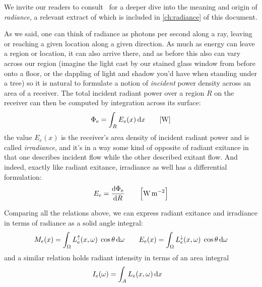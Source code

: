 We invite our readers to consult~\cite{nicodemus63} for a deeper dive into
the meaning and origin of \textsl{\gls{radiance}}, a relevant
extract of which is included in \cref{ch:radiance} of this document.

As we said, one can think of radiance as photons per second along 
a ray, leaving or reaching a given location along a given direction.
As much as energy can leave a region or location, it can also
arrive there, and as before this also can vary across our region 
(imagine the light cast by our stained glass window from before onto a floor,
or the dappling of light and shadow you'd have when standing under a tree)
so it is natural to formulate a notion of \emph{incident} power density across 
an area of a receiver. 
The total incident radiant power over a region $R$ on the receiver can then be computed by
integration across its surface:
\begin{displaymath}
	\Phi_e = \int_{R} E_e(x) \d x \qquad [\unit{\watt}]
\end{displaymath}
the value $E_e(x)$ is the receiver's area density of incident radiant power and
is called \textit{irradiance}, and it's in a way some kind of opposite of radiant exitance
in that one describes incident flow while the other described exitant flow.
And indeed, exactly like radiant exitance, irradiance as well has a differential formulation:
\begin{displaymath}
	E_e = \frac{\d\Phi_e}{\d R} \qquad \left[\unit{\watt\per\square\meter}\right]
\end{displaymath}

Comparing all the relations above, we can express radiant exitance 
and irradiance in terms of radiance as a solid angle integral:
\begin{displaymath}
	M_e(x) = \int_\Omega L_e^\uparrow(x,\omega) \;\cos\theta \mathop{}\!\mathrm{d}\omega \qquad
	E_e(x) = \int_\Omega L_e^\downarrow(x,\omega) \;\cos\theta \mathop{}\!\mathrm{d}\omega
\end{displaymath}
and a similar relation holds radiant intensity in terms of an area integral
\begin{displaymath}
	I_e(\omega) = \int_A L_e(x,\omega) \mathop{}\!\mathrm{d} x \quad
\end{displaymath}

